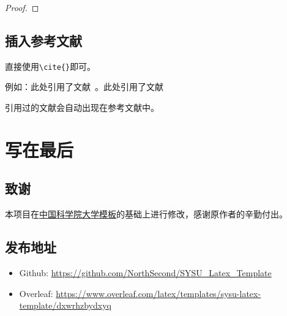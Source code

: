 \documentclass{CQMUReport}
\begin{document}
\begin{Example}
\end{Example}

\begin{proof}
\end{proof}

\subsection{插入参考文献}

直接使用\verb|\cite{}|即可。

例如：此处引用了文献~\cite{0Isaac}。此处引用了文献~\cite{2016The}

\par 引用过的文献会自动出现在参考文献中。

\section{写在最后}

\subsection{致谢}

本项目在\href{https://github.com/jweihe/UCAS_Latex_Template}{中国科学院大学模板}的基础上进行修改，感谢原作者的辛勤付出。

\subsection{发布地址}

\begin{itemize}
    \item Github: \url{https://github.com/NorthSecond/SYSU_Latex_Template}
    \item Overleaf: \url{https://www.overleaf.com/latex/templates/sysu-latex-template/dxwrhzbydxyq}
\end{itemize}


\newpage


\end{document}
